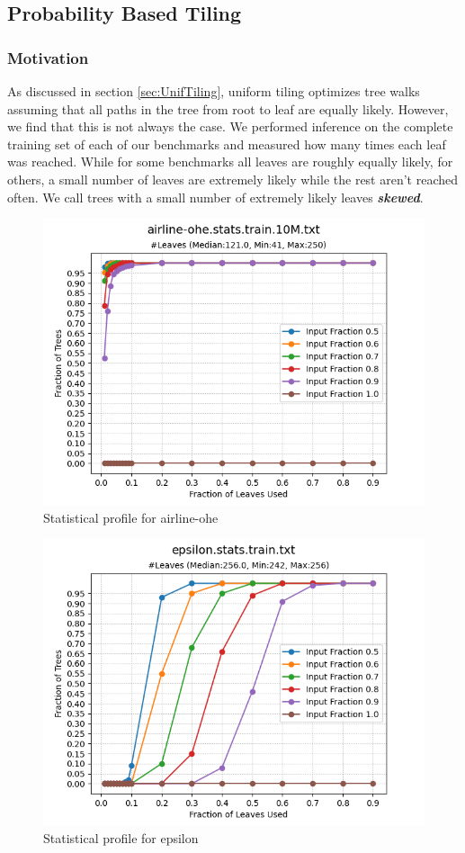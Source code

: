 \subsection{Probability Based Tiling}
\subsubsection{Motivation}
As discussed in section \ref{sec:UnifTiling}, uniform tiling optimizes tree walks assuming that all paths in the tree from root to leaf are equally likely. 
However, we find that this is not always the case. We performed inference on the complete training set of each of our benchmarks and measured how many
times each leaf was reached. While for some benchmarks all leaves are roughly equally likely, for others, a small number of leaves are extremely likely 
while the rest aren't reached often. We call trees with a small number of extremely likely leaves \textbf{\emph{skewed}}.
\begin{figure}
    \centering
    \includegraphics[width=\linewidth]{figures/airline-ohe.stats.train.txt.png}
    \caption{Statistical profile for airline-ohe}
    \label{Fig:AirlineOHEStats}
\end{figure}
\begin{figure}
    \centering
    \includegraphics[width=\linewidth]{figures/epsilon.stats.train.txt.png}
    \caption{Statistical profile for epsilon}
    \label{Fig:EpsilonStats}
\end{figure}
